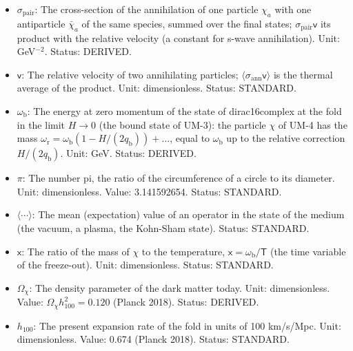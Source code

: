 \documentclass[
  10pt,
]{article}
\providecommand{\tightlist}{%
  \setlength{\itemsep}{0pt}\setlength{\parskip}{0pt}}
\begin{document}
\begin{itemize}
\tightlist
\item
  \(\sigma_{\mathrm{pair}}\): The cross-section of the annihilation of
  one particle \(\chi_a\) with one antiparticle \(\bar\chi_a\) of the
  same species, summed over the final states;
  \(\sigma_{\mathrm{pair}}\mathsf{v}\) its product with the relative
  velocity (a constant for s-wave annihilation). Unit: GeV\(^{-2}\).
  Status: DERIVED.
\item
  \(\mathsf{v}\): The relative velocity of two annihilating particles;
  \(\langle\sigma_{\mathrm{ann}}\mathsf{v}\rangle\) is the thermal
  average of the product. Unit: dimensionless. Status: STANDARD.
\item
  \(\omega_{\mathrm{b}}\): The energy at zero momentum of the state of
  dirac16complex at the fold in the limit \(H \to 0\) (the bound state
  of UM-3): the particle \(\chi\) of UM-4 has the mass
  \(\omega_{\mathrm{r}} = \omega_{\mathrm{b}}(1 - H/(2q_{\mathrm{b}})) + \dots\),
  equal to \(\omega_{\mathrm{b}}\) up to the relative correction
  \(H/(2q_{\mathrm{b}})\). Unit: GeV. Status: DERIVED.
\item
  \(\pi\): The number pi, the ratio of the circumference of a circle to
  its diameter. Unit: dimensionless. Value: 3.141592654. Status:
  STANDARD.
\item
  \(\langle\cdots\rangle\): The mean (expectation) value of an operator
  in the state of the medium (the vacuum, a plasma, the Kohn-Sham
  state). Status: STANDARD.
\item
  \(\mathsf{x}\): The ratio of the mass of \(\chi\) to the temperature,
  \(\mathsf{x} = \omega_{\mathrm{b}}/\mathsf{T}\) (the time variable of
  the freeze-out). Unit: dimensionless. Status: STANDARD.
\item
  \(\Omega_\chi\): The density parameter of the dark matter today. Unit:
  dimensionless. Value: \(\Omega_\chi h_{100}^2 = 0.120\) (Planck 2018).
  Status: DERIVED.
\item
  \(h_{100}\): The present expansion rate of the fold in units of 100
  km/s/Mpc. Unit: dimensionless. Value: 0.674 (Planck 2018). Status:
  STANDARD.
\end{itemize}
\end{document}
